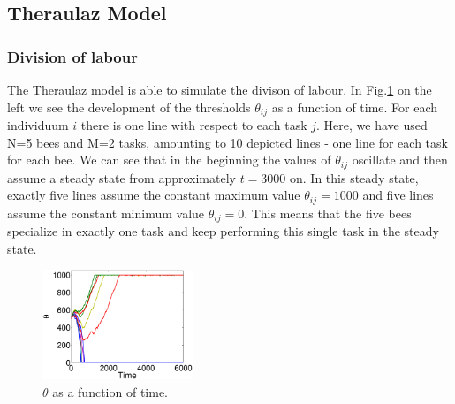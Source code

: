
\subsection{Theraulaz Model}
\subsubsection*{Division of labour}
The Theraulaz model is able to simulate the divison of labour. In Fig.\ref{fig:thetax} on the left we see the development of the thresholds $\theta_{ij}$ as a function of time. For each individuum $i$ there is one line with respect to each task $j$. Here, we have used N=5 bees and M=2 tasks, amounting to 10 depicted lines - one line for each task for each bee. We can see that in the beginning the values of $\theta_{ij}$ oscillate and then assume a steady state from approximately $t=3000$ on. In this steady state, exactly five lines assume the constant maximum value $\theta_{ij}=1000$ and five lines assume the constant minimum value $\theta_{ij}=0$. This means that the five bees specialize in exactly one task and keep performing this single task in the steady state.

\begin{figure}[ht!]
	\centering
	\includegraphics[width=0.4\textwidth]{figures/thetax.eps}
	\caption{$\theta$ as a function of time.}
	\label{fig:thetax}
\end{figure}

